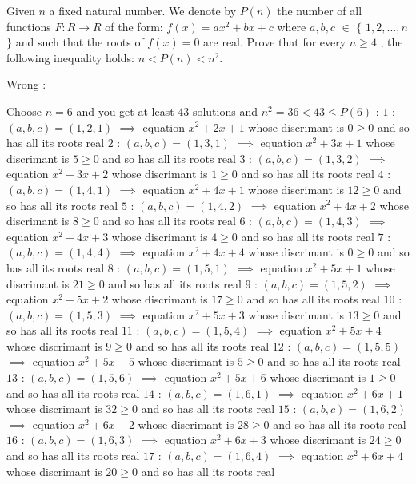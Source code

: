 \begin{solution}
	\begin{tcolorbox}Given $n$ a fixed natural number. We denote by $P(n)$ the number of all functions $ F:R\rightarrow R $ of the form: $f(x)=ax^2+bx+c$ where $a,b,c$ $\in$ $\{$ $1,2,...,n$ $\}$ and such that the roots of $f(x)=0$ are real. Prove that for every $n\geq 4$ , the following inequality holds: $n<P(n)<n^2$.\end{tcolorbox}
Wrong :

Choose $n=6$ and you get at least $43$ solutions and $n^2=36<43\le P(6)$ :
$1$ : $(a,b,c)=(1,2,1)$ $\implies$ equation $x^2+2x+1$ whose discrimant is $0\ge 0$ and so has all its roots real
$2$ : $(a,b,c)=(1,3,1)$ $\implies$ equation $x^2+3x+1$ whose discrimant is $5\ge 0$ and so has all its roots real
$3$ : $(a,b,c)=(1,3,2)$ $\implies$ equation $x^2+3x+2$ whose discrimant is $1\ge 0$ and so has all its roots real
$4$ : $(a,b,c)=(1,4,1)$ $\implies$ equation $x^2+4x+1$ whose discrimant is $12\ge 0$ and so has all its roots real
$5$ : $(a,b,c)=(1,4,2)$ $\implies$ equation $x^2+4x+2$ whose discrimant is $8\ge 0$ and so has all its roots real
$6$ : $(a,b,c)=(1,4,3)$ $\implies$ equation $x^2+4x+3$ whose discrimant is $4\ge 0$ and so has all its roots real
$7$ : $(a,b,c)=(1,4,4)$ $\implies$ equation $x^2+4x+4$ whose discrimant is $0\ge 0$ and so has all its roots real
$8$ : $(a,b,c)=(1,5,1)$ $\implies$ equation $x^2+5x+1$ whose discrimant is $21\ge 0$ and so has all its roots real
$9$ : $(a,b,c)=(1,5,2)$ $\implies$ equation $x^2+5x+2$ whose discrimant is $17\ge 0$ and so has all its roots real
$10$ : $(a,b,c)=(1,5,3)$ $\implies$ equation $x^2+5x+3$ whose discrimant is $13\ge 0$ and so has all its roots real
$11$ : $(a,b,c)=(1,5,4)$ $\implies$ equation $x^2+5x+4$ whose discrimant is $9\ge 0$ and so has all its roots real
$12$ : $(a,b,c)=(1,5,5)$ $\implies$ equation $x^2+5x+5$ whose discrimant is $5\ge 0$ and so has all its roots real
$13$ : $(a,b,c)=(1,5,6)$ $\implies$ equation $x^2+5x+6$ whose discrimant is $1\ge 0$ and so has all its roots real
$14$ : $(a,b,c)=(1,6,1)$ $\implies$ equation $x^2+6x+1$ whose discrimant is $32\ge 0$ and so has all its roots real
$15$ : $(a,b,c)=(1,6,2)$ $\implies$ equation $x^2+6x+2$ whose discrimant is $28\ge 0$ and so has all its roots real
$16$ : $(a,b,c)=(1,6,3)$ $\implies$ equation $x^2+6x+3$ whose discrimant is $24\ge 0$ and so has all its roots real
$17$ : $(a,b,c)=(1,6,4)$ $\implies$ equation $x^2+6x+4$ whose discrimant is $20\ge 0$ and so has all its roots real

\end{solution}
